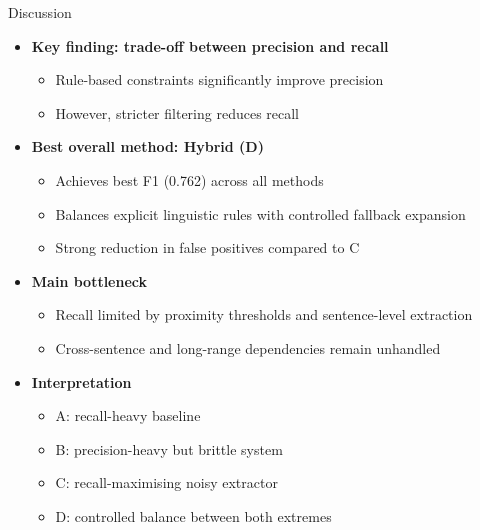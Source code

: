 \documentclass[aspectratio=169,11pt]{beamer}
\begin{document}

\begin{frame}{Discussion}
\small

\begin{itemize}
  \item \textbf{Key finding: trade-off between precision and recall}
  \begin{itemize}
    \item Rule-based constraints significantly improve precision
    \item However, stricter filtering reduces recall
  \end{itemize}

  \item \textbf{Best overall method: Hybrid (D)}
  \begin{itemize}
    \item Achieves best F1 (0.762) across all methods
    \item Balances explicit linguistic rules with controlled fallback expansion
    \item Strong reduction in false positives compared to C
  \end{itemize}

  \item \textbf{Main bottleneck}
  \begin{itemize}
    \item Recall limited by proximity thresholds and sentence-level extraction
    \item Cross-sentence and long-range dependencies remain unhandled
  \end{itemize}

  \item \textbf{Interpretation}
  \begin{itemize}
    \item A: recall-heavy baseline
    \item B: precision-heavy but brittle system
    \item C: recall-maximising noisy extractor
    \item D: controlled balance between both extremes
  \end{itemize}

\end{itemize}

\end{frame}

\end{document}
